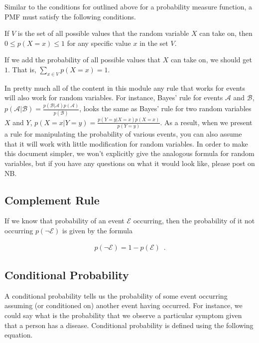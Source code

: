 \documentclass{tufte-handout}
\begin{document}
Similar to the conditions for outlined above for a probability measure function, a PMF must satisfy the following conditions.
\be
\item If $V$ is the set of all possible values that the random variable $X$ can take on, then $0 \leq p(X = x) \leq 1$ for any specific value $x$ in the set $V$.
\item If we add the probability of all possible values that $X$ can take on, we should get $1$.  That is, $\sum_{x \in V} p(X = x) = 1$.
\ee

\begin{notice}
In pretty much all of the content in this module any rule that works for events will also work for random variables.  For instance, Bayes' rule for events $\mathcal{A}$ and $\mathcal{B}$, $p(\mathcal{A} | \mathcal{B}) = \frac{p(\mathcal{B}|\mathcal{A}) p(\mathcal{A})}{p(\mathcal{B})}$, looks the same as Bayes' rule for two random variables $X$ and $Y$, $p(X=x | Y=y) = \frac{p(Y=y|X=x) p(X=x)}{p(Y=y)}$.  As a result, when we present a rule for manipulating the probability of various events, you can also assume that it will work with little modification for random variables.  In order to make this document simpler, we won't explicitly give the analogous formula for random variables, but if you have any questions on what it would look like, please post on NB.
\end{notice}

\subsection{Complement Rule}

If we know that probability of an event $\mathcal{E}$ occurring, then the probability of it not occurring $p(\neg \mathcal{E})$ is given by the formula

\begin{align}
p(\neg \mathcal{E}) = 1 - p(\mathcal{E}) \enspace .
\end{align}

\subsection{Conditional Probability}
A conditional probability tells us the probability of some event occurring assuming (or conditioned on) another event having occurred.  For instance, we could say what is the probability that we observe a particular symptom given that a person has a disease.  Conditional probability is defined using the following equation.
\end{document}
